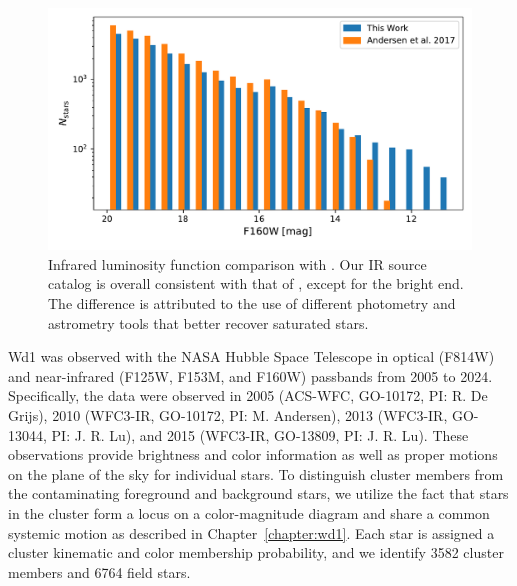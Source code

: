 \documentclass[12pt]{ucsddissertation}
\begin{document}
\begin{CJK*}{UTF8}{gbsn}
\begin{figure}[htb!]
    \centering
    \includegraphics[width=\linewidth]{figures/chapter3/Luminosity_Function_Comparison.pdf}
    \caption[Infrared luminosity function comparison]{Infrared luminosity function comparison with \citet{Andersen-2017}. Our IR source catalog is overall consistent with that of \citet{Andersen-2017}, except for the bright end. The difference is attributed to the use of different photometry and astrometry tools that better recover saturated stars.}
    \label{fig:luminosity_function_comparison}
\end{figure}

Wd1 was observed with the NASA Hubble Space Telescope in optical (F814W) and near-infrared (F125W, F153M, and F160W) passbands from 2005 to 2024. Specifically, the data were observed in 2005 (ACS-WFC, GO-10172, PI: R. De Grijs), 2010 (WFC3-IR, GO-10172, PI: M. Andersen), 2013 (WFC3-IR, GO-13044, PI: J. R. Lu), and 2015 (WFC3-IR, GO-13809, PI: J. R. Lu). These observations provide brightness and color information as well as proper motions on the plane of the sky for individual stars. To distinguish cluster members from the contaminating foreground and background stars, we utilize the fact that stars in the cluster form a locus on a color-magnitude diagram and share a common systemic motion as described in Chapter~\ref{chapter:wd1}. Each star is assigned a cluster kinematic and color membership probability, and we identify \num{3582} cluster members and \num{6764} field stars. 



\end{CJK*}
\end{document}
